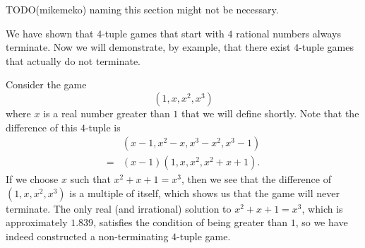 \documentclass[12pt]{amsart}
\begin{document}
TODO(mikemeko) naming this section might not be necessary.

We have shown that $4$-tuple games that start with $4$ rational numbers always terminate. Now we will demonstrate, by example, that there exist $4$-tuple games that actually do not terminate.

Consider the game
$$
(1,x,x^2,x^3)
$$
where $x$ is a real number greater than $1$ that we will define shortly. Note that the difference of this $4$-tuple is
\begin{align*}
& (x-1, x^2 - x, x^3 - x^2, x^3 - 1)\\
= & (x-1) (1, x, x^2, x^2 + x + 1).
\end{align*}
If we choose $x$ such that $x^2 + x + 1 = x^3$, then we see that the difference of $(1,x,x^2,x^3)$ is a multiple of itself, which shows us that the game will never terminate. The only real (and irrational) solution to $x^2 + x + 1 = x^3$, which is approximately $1.839$, satisfies the condition of being greater than $1$, so we have indeed constructed a non-terminating $4$-tuple game.
\end{document}
